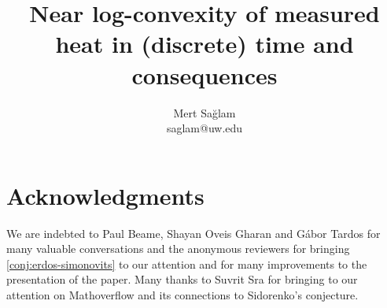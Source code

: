 \documentclass[10pt,letterpaper]{article}
\begin{document}
\author{%
  \vspace{-0.5em}\fontsize{10}{10}\selectfont Mert Sağlam%
  \\\vspace{-0.5em}\fontsize{9}{9}\selectfont saglam@uw.edu}
\title{\bf\fontsize{15}{19}\selectfont
  Near log-convexity of measured heat in
  (discrete) time and consequences}
\date{}
\maketitle
\vspace{-25px}


\tableofcontents
\newpage







\section*{Acknowledgments}
We are indebted to Paul Beame, 
Shayan Oveis Gharan and Gábor Tardos for many valuable
conversations and the anonymous reviewers for bringing 
\autoref{conj:erdos-simonovits} to our attention and for
many improvements to the presentation of the paper. 
Many thanks to Suvrit Sra for bringing \cite{Pate2012} 
to our attention on Mathoverflow \cite{Sra2016} and 
its connections to Sidorenko's conjecture.
\printbibliography
\end{document}
